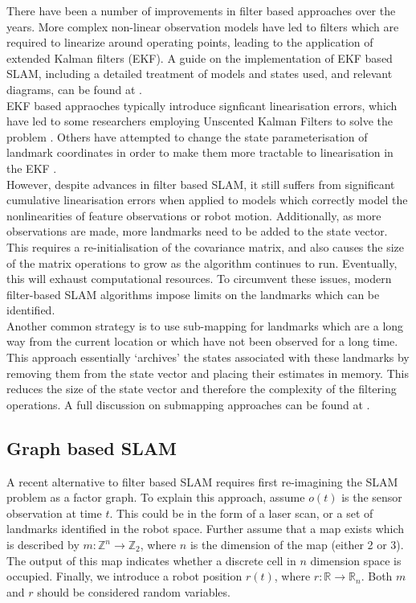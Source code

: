 \documentclass[capstone_report.tex]{subfiles}
\begin{document}
There have been a number of improvements in filter based approaches over the years. More complex non-linear observation models have led to filters which are required to linearize around operating points, leading to the application of extended Kalman filters (EKF). A guide on the implementation of EKF based SLAM, including a detailed treatment of models and states used, and relevant diagrams, can be found at \cite{ekftutorial}.\\ 

EKF based appraoches typically introduce signficant linearisation errors, which have led to some researchers employing Unscented Kalman Filters to solve the problem \cite{julier}. Others have attempted to change the state parameterisation of landmark coordinates in order to make them more tractable to linearisation in the EKF \cite{julier}.\\

However, despite advances in filter based SLAM, it still suffers from significant cumulative linearisation errors when applied to models which correctly model the nonlinearities of feature observations or robot motion. Additionally, as more observations are made, more landmarks need to be added to the state vector. This requires a re-initialisation of the covariance matrix, and also causes the size of the matrix operations to grow as the algorithm continues to run. Eventually, this will exhaust computational resources. To circumvent these issues, modern filter-based SLAM algorithms impose limits on the landmarks which can be identified.\\

Another common strategy is to use sub-mapping for landmarks which are a long way from the current location or which have not been observed for a long time. This approach essentially `archives' the states associated with these landmarks by removing them from the state vector and placing their estimates in memory. This reduces the size of the state vector and therefore the complexity of the filtering operations. A full discussion on submapping approaches can be found at \cite{slamoverview}.

\subsection{Graph based SLAM}
A recent alternative to filter based SLAM requires first re-imagining the SLAM problem as a factor graph. To explain this approach, assume $o(t)$ is the sensor observation at time $t$. This could be in the form of a laser scan, or a set of landmarks identified in the robot space. Further assume that a map exists which is described by $m:\mathbb Z^n\to\mathbb Z_2$, where $n$ is the dimension of the map (either 2 or 3). The output of this map indicates whether a discrete cell in $n$ dimension space is occupied. Finally, we introduce a robot position $r(t)$, where $r:\mathbb R\to\mathbb R_n$. Both $m$ and $r$ should be considered random variables.\\
\end{document}
